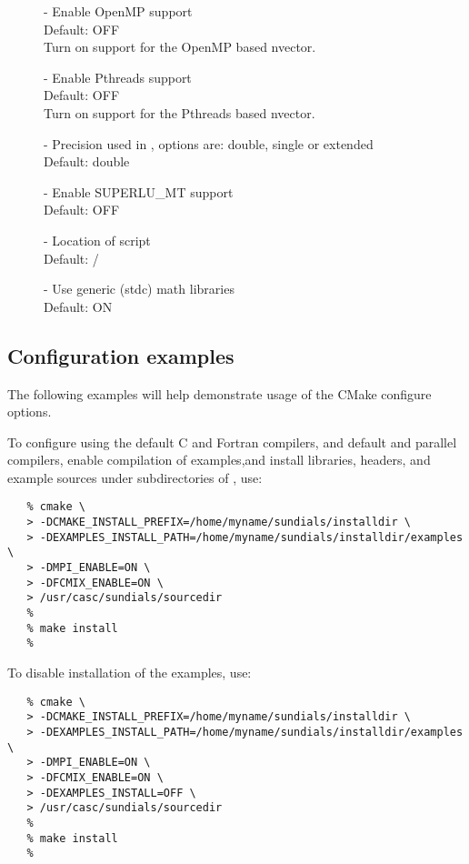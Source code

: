 \begin{description}
\item[] -  
  Enable OpenMP support
  \\
  Default: OFF 
  \\
  Turn on support for the OpenMP based nvector.
\item[] -  
  Enable Pthreads support
  \\
  Default: OFF 
  \\
  Turn on support for the Pthreads based nvector.
\item[] -   
  Precision used in {\sundials}, options are: double, single or extended
  \\
  Default: double 
\item[] - 
  Enable SUPERLU\_MT support   
  \\
  Default: OFF 
\item[] - 
  Location of  script   
  \\
  Default: / 
\item[] -   
  Use generic (stdc) math libraries
  \\
  Default: ON 
\end{description}


\subsection{Configuration examples}

The following examples will help demonstrate usage of the CMake configure options.

To configure {\sundials} using the default C and Fortran compilers,
and default  and  parallel compilers, 
enable compilation of examples,and install libraries, headers, and
example sources under subdirectories of
, use:

\begin{verbatim}
   % cmake \
   > -DCMAKE_INSTALL_PREFIX=/home/myname/sundials/installdir \
   > -DEXAMPLES_INSTALL_PATH=/home/myname/sundials/installdir/examples \
   > -DMPI_ENABLE=ON \
   > -DFCMIX_ENABLE=ON \
   > /usr/casc/sundials/sourcedir
   %
   % make install
   % 
\end{verbatim}

\noindent To disable installation of the examples, use:
\begin{verbatim}
   % cmake \
   > -DCMAKE_INSTALL_PREFIX=/home/myname/sundials/installdir \
   > -DEXAMPLES_INSTALL_PATH=/home/myname/sundials/installdir/examples \
   > -DMPI_ENABLE=ON \
   > -DFCMIX_ENABLE=ON \
   > -DEXAMPLES_INSTALL=OFF \
   > /usr/casc/sundials/sourcedir
   %
   % make install
   % 
\end{verbatim}

